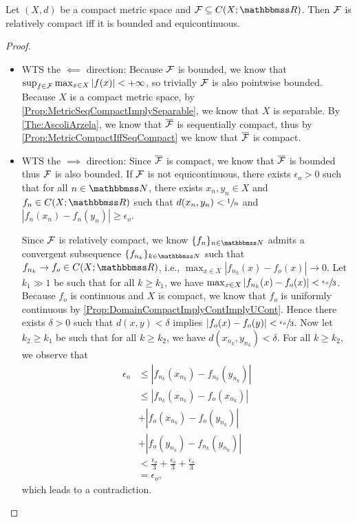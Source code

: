 \documentclass[screen,single]{techreport}
\numberwithin{equation}{section}
\begin{document}
\begin{corollary}\label{Cor:RelCompactIffBoundedAndEquicont}
  Let $(X,d)$ be a compact metric space and $\calF \subseteq C(X;\bbR)$.
  Then $\mathcal{F}$ is relatively compact iff it is bounded and equicontinuous.
\end{corollary}
\begin{proof}\
  \begin{itemize}
    \item WTS the $\impliedby$ direction: Because $\mathcal{F}$ is bounded, we know that $\sup_{f \in \mathcal{F}} \max_{x \in X} |f(x)| < +\infty$, so trivially $\mathcal{F}$ is also pointwise bounded.
    Because $X$ is a compact metric space, by \cref{Prop:MetricSeqCompactImplySeparable}, we know that $X$ is separable.
    By \cref{The:AscoliArzela}, we know that $\overline{\mathcal{F}}$ is sequentially compact, thus by \cref{Prop:MetricCompactIffSeqCompact} we know that $\overline{\mathcal{F}}$ is compact.
    
    \item WTS the $\implies$ direction:
    Since $\overline{\mathcal{F}}$ is compact, we know that $\overline{\mathcal{F}}$ is bounded thus $\mathcal{F}$ is also bounded.
    If $\mathcal{F}$ is not equicontinuous, there exists $\epsilon_o > 0$ such that for all $n \in \bbN$, there exists $x_n,y_n \in X$ and $f_n \in C(X;\bbR)$ such that $d(x_n,y_n) < \sfrac{1}{n}$ and $|f_n(x_n) - f_n(y_n)| \ge \epsilon_o$.
    
    Since $\mathcal{F}$ is relatively compact, we know $\{f_n\}_{n \in \bbN}$ admits a convergent subsequence $\{f_{n_k}\}_{k \in \bbN}$ such that $f_{n_k} \rightarrow f_o \in C(X;\bbR)$, i.e., $\max_{x \in X} |f_{n_k}(x) - f_o(x)| \rightarrow 0$.
    Let $k_1 \gg 1$ be such that for all $k \ge k_1$, we have $\max_{x \in X} |f_{n_k}(x) - f_o(x)| < \sfrac{\epsilon_o}{3}$.
    Because $f_o$ is continuous and $X$ is compact, we know that $f_o$ is uniformly continuous by \cref{Prop:DomainCompactImplyContImplyUCont}.
    Hence there exists $\delta > 0$ such that $d(x,y) < \delta$ implies $|f_o(x) - f_o(y)| < \sfrac{\epsilon_o}{3}$.
    Now let $k_2 \ge k_1$ be such that for all $k \ge k_2$, we have $d(x_{n_k},y_{n_k}) < \delta$.
    For all $k \ge k_2$, we observe that
    \begin{align*}
      \epsilon_o  & \le |f_{n_k}(x_{n_k}) - f_{n_k}(y_{n_k})|   \\
      & \le |f_{n_k}(x_{n_k}) - f_o(x_{n_k})| \\
      & + |f_o(x_{n_k}) - f_o(y_{n_k})| \\
      & + |f_o(y_{n_k}) - f_{n_k}(y_{n_k}) | \\
      & < \frac{\epsilon_o}{3} + \frac{\epsilon_o}{3} + \frac{\epsilon_o}{3} \\
      & = \epsilon_o,
    \end{align*}
    which leads to a contradiction.
  \end{itemize}
\end{proof}
\end{document}
